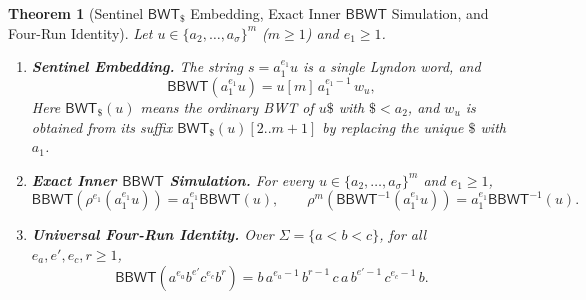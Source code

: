 \documentclass[11pt,a4paper]{article}
\newtheorem{theorem}{Theorem}
\theoremstyle{definition}
\newcommand{\BBWT}{\mathsf{BBWT}}
\newcommand{\BWT}{\mathsf{BWT}}
\begin{document}
\begin{theorem}[Sentinel $\BWT_{\$}$ Embedding, Exact Inner $\BBWT$ Simulation, and Four-Run Identity]
\label{thm:sentinel}
Let $u \in \{a_2, \dots, a_\sigma\}^m$ ($m \ge 1$) and $e_1 \ge 1$.
\begin{enumerate}[label=(\arabic*),leftmargin=*]
    \item \textbf{Sentinel Embedding.} The string $s = a_1^{e_1} u$ is a single Lyndon word, and
    \[
    \BBWT(a_1^{e_1} u) = u[m] \, a_1^{e_1 - 1} \, w_u,
    \]
    Here $\BWT_{\$}(u)$ means the ordinary BWT of $u\$$ with $\$<a_2$, and $w_u$ is obtained from its suffix $\BWT_{\$}(u)[2..m+1]$ by replacing the unique $\$$ with $a_1$.
    \item \textbf{Exact Inner $\BBWT$ Simulation.} For every $u \in \{a_2,\dots,a_\sigma\}^m$ and $e_1 \ge 1$,
    \[
    \BBWT(\rho^{e_1}(a_1^{e_1} u)) = a_1^{e_1} \BBWT(u), \qquad
    \rho^{m}(\BBWT^{-1}(a_1^{e_1} u)) = a_1^{e_1} \BBWT^{-1}(u).
    \]
    \item \textbf{Universal Four-Run Identity.} Over $\Sigma = \{a < b < c\}$, for all $e_a, e', e_c, r \ge 1$,
    \[
    \BBWT(a^{e_a} b^{e'} c^{e_c} b^r) = b \, a^{e_a - 1} \, b^{r-1} \, c \, a \, b^{e'-1} \, c^{e_c - 1} \, b.
    \]
\end{enumerate}
\end{theorem}
\end{document}
